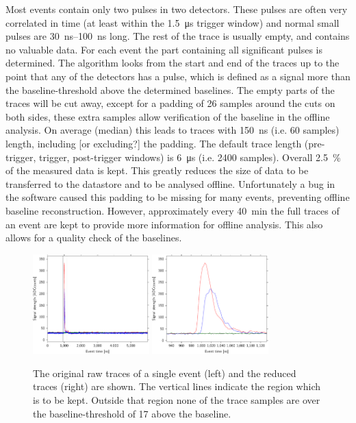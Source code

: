 Most events contain only two pulses in two detectors. These pulses are often very correlated in time (at least within the \SI{1.5}{\micro\second} trigger window) and normal small pulses are \SIrange{30}{100}{\ns} long. The rest of the trace is usually empty, and contains no valuable data. For each event the part containing all significant pulses is determined. The algorithm looks from the start and end of the traces up to the point that any of the detectors has a pulse, which is defined as a signal more than the baseline-threshold above the determined baselines. The empty parts of the traces will be cut away, except for a padding of \num{26} samples around the cuts on both sides, these extra samples allow verification of the baseline in the offline analysis. On average (median) this leads to traces with \SI{150}{\ns} (i.e. 60 samples) length, including [or excluding?] the padding. The default trace length (pre-trigger, trigger, post-trigger windows) is \SI{6}{\micro\second} (i.e. 2400 samples). Overall \SI{2.5}{\percent} of the measured data is kept. This greatly reduces the size of data to be transferred to the datastore and to be analysed offline.  Unfortunately a bug in the \daq software caused this padding to be missing for many events, preventing offline baseline reconstruction. However, approximately every \SI{40}{\minute} the full traces of an event are kept to provide more information for offline analysis. This also allows for a quality check of the baselines.

\begin{figure}
    \centering
    \includegraphics[width=0.4\textwidth]{plots/processing/raw_trace_region_reduced}
    \includegraphics[width=0.4\textwidth]{plots/processing/reduced_traces}
    \caption{The original raw traces of a single event (left) and the reduced traces (right) are shown. The vertical lines indicate the region which is to be kept. Outside that region none of the trace samples are over the baseline-threshold of \SI{17}{\adc} above the baseline.}
    \label{fig:data_reduction}
\end{figure}

